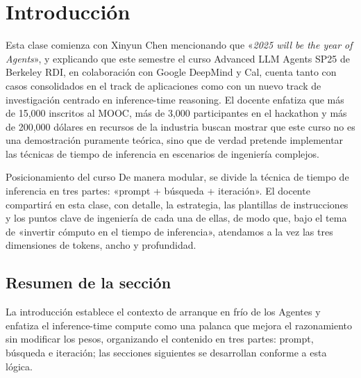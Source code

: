 \section{Introducción}
Esta clase comienza con Xinyun Chen mencionando que «\textit{2025 will be the year of Agents}», y explicando que este semestre el curso Advanced LLM Agents SP25 de Berkeley RDI, en colaboración con Google DeepMind y Cal, cuenta tanto con casos consolidados en el track de aplicaciones como con un nuevo track de investigación centrado en inference-time reasoning. El docente enfatiza que más de 15,000 inscritos al MOOC, más de 3,000 participantes en el hackathon y más de 200,000 dólares en recursos de la industria buscan mostrar que este curso no es una demostración puramente teórica, sino que de verdad pretende implementar las técnicas de tiempo de inferencia en escenarios de ingeniería complejos.

\begin{knowledgebox}{Posicionamiento del curso}
De manera modular, se divide la técnica de tiempo de inferencia en tres partes: «prompt + búsqueda + iteración». El docente compartirá en esta clase, con detalle, la estrategia, las plantillas de instrucciones y los puntos clave de ingeniería de cada una de ellas, de modo que, bajo el tema de «invertir cómputo en el tiempo de inferencia», atendamos a la vez las tres dimensiones de tokens, ancho y profundidad.
\end{knowledgebox}

\subsection{Resumen de la sección}
La introducción establece el contexto de arranque en frío de los Agentes y enfatiza el inference-time compute como una palanca que mejora el razonamiento sin modificar los pesos, organizando el contenido en tres partes: prompt, búsqueda e iteración; las secciones siguientes se desarrollan conforme a esta lógica.
